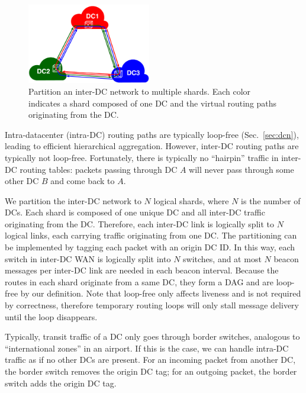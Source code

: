 \begin{figure}[t]
\centering
\includegraphics[width=0.48\textwidth]{images/inter-DC.pdf}
\caption{Partition an inter-DC network to multiple shards. Each color indicates a shard composed of one DC and the virtual routing paths originating from the DC.}
\label{fig:inter-dc}
\end{figure}



Intra-datacenter (intra-DC) routing paths are typically loop-free (Sec.~\ref{sec:dcn}), leading to efficient hierarchical aggregation. However, inter-DC routing paths are typically not loop-free. Fortunately, there is typically no ``hairpin'' traffic in inter-DC routing tables: packets passing through DC $A$ will never pass through some other DC $B$ and come back to $A$.

We partition the inter-DC network to $N$ logical shards, where $N$ is the number of DCs. Each shard is composed of one unique DC and all inter-DC traffic originating from the DC. Therefore, each inter-DC link is logically split to $N$ logical links, each carrying traffic originating from one DC.
The partitioning can be implemented by tagging each packet with an origin DC ID.
In this way, each switch in inter-DC WAN is logically split into $N$ switches, and at most $N$ beacon messages per inter-DC link are needed in each beacon interval.
Because the routes in each shard originate from a same DC, they form a DAG and are loop-free by our definition.
Note that loop-free only affects liveness and is not required by correctness, therefore temporary routing loops will only stall message delivery until the loop disappears.

Typically, transit traffic of a DC only goes through border switches, analogous to ``international zones'' in an airport. If this is the case, we can handle intra-DC traffic as if no other DCs are present. For an incoming packet from another DC, the border switch removes the origin DC tag; for an outgoing packet, the border switch adds the origin DC tag.
\fi
